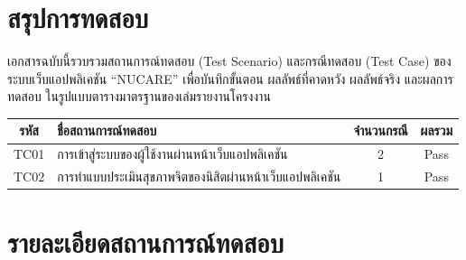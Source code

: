 \documentclass[11pt,a4paper]{article}
\begin{document}
\maketestcover

\section*{สรุปการทดสอบ}
เอกสารฉบับนี้รวบรวมสถานการณ์ทดสอบ (Test Scenario) และกรณีทดสอบ (Test Case)
ของระบบเว็บแอปพลิเคชัน ``NUCARE'' เพื่อบันทึกขั้นตอน ผลลัพธ์ที่คาดหวัง ผลลัพธ์จริง และผลการทดสอบ
ในรูปแบบตารางมาตรฐานของเล่มรายงานโครงงาน

\begin{center}
\begin{tabularx}{0.92\linewidth}{|c|Y|c|c|}
\hline
{}
\textbf{รหัส} & \textbf{ชื่อสถานการณ์ทดสอบ} & \textbf{จำนวนกรณี} & \textbf{ผลรวม} \\
\hline
TC01 & การเข้าสู่ระบบของผู้ใช้งานผ่านหน้าเว็บแอปพลิเคชัน & 2 & Pass \\
\hline
TC02 & การทำแบบประเมินสุขภาพจิตของนิสิตผ่านหน้าเว็บแอปพลิเคชัน & 1 & Pass \\
\hline
\end{tabularx}
\end{center}

\clearpage

\section*{รายละเอียดสถานการณ์ทดสอบ}



\end{document}
